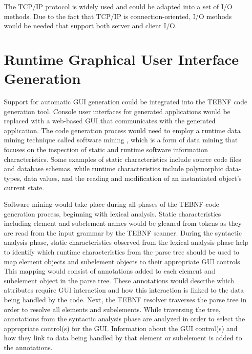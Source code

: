 \indent
The TCP/IP protocol is widely used and could be adapted into a set of I/O methods.  Due to the fact that TCP/IP is connection-oriented, I/O methods would be needed that support both server and client I/O.

\section{Runtime Graphical User Interface Generation}
Support for automatic GUI generation could be integrated into the TEBNF code generation tool.  Console user interfaces for generated applications would be replaced with a web-based GUI that communicates with the generated application.  The code generation process would need to employ a runtime data mining technique called software mining \cite{kennard_01,kennard_02}, which is a form of data mining that focuses on the inspection of static and runtime software information characteristics.  Some examples of static characteristics include source code files and database schemas, while runtime characteristics include polymorphic data-types, data values, and the reading and modification of an instantiated object’s current state.

\indent
Software mining would take place during all phases of the TEBNF code generation process, beginning with lexical analysis.  Static characteristics including element and subelement names would be gleaned from tokens as they are read from the input grammar by the TEBNF scanner.  During the syntactic analysis phase, static characteristics observed from the lexical analysis phase help to identify which runtime characteristics from the parse tree should be used to map element objects and subelement objects to their appropriate GUI controls.  This mapping would consist of annotations added to each element and subelement object in the parse tree.  These annotations would describe which attributes require GUI interaction and how this interaction is linked to the data being handled by the code.
Next, the TEBNF resolver traverses the parse tree in order to resolve all elements and subelements.  While traversing the tree, annotations from the syntactic analysis phase are analyzed in order to select the appropriate control(s) for the GUI.  Information about the GUI control(s) and how they link to data being handled by that element or subelement is added to the annotations.

